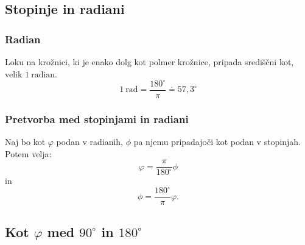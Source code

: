             

        


        
        
            \subsection{Stopinje in radiani}
            
            \subsubsection*{Radian}
                Loku na krožnici, ki je enako dolg kot polmer krožnice, pripada središčni kot, velik $1 \ \textrm{radian}$.
                $$ 1 \ \textrm{rad}=\frac{180^\circ}{\pi}\doteq 57,3^\circ$$
            

            \subsubsection*{Pretvorba med stopinjami in radiani}
                Naj bo kot $\varphi$ podan v radianih, $\phi$ pa njemu pripadajoči kot podan v stopinjah. Potem velja:
                $$ \varphi = \frac{\pi}{180^\circ}\phi$$
                in 
                $$ \phi = \frac{180^\circ}{\pi} \varphi.$$
            
        


        
            \subsection{Kot $\varphi$ med $90^\circ$ in $180^\circ$}

            
            
